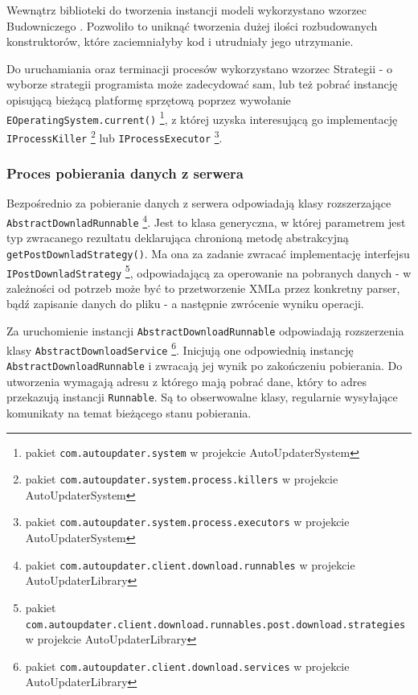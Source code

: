 \documentclass[polish,12pt,titlepage]{article}
\begin{document}
Wewnątrz biblioteki do tworzenia instancji  modeli wykorzystano wzorzec
Budowniczego \cite{BUDOWNICZY}. Pozwoliło to uniknąć tworzenia dużej ilości
rozbudowanych konstruktorów, które zaciemniałyby kod i utrudniały jego
utrzymanie.

Do uruchamiania oraz terminacji procesów wykorzystano wzorzec Strategii
\cite{STRATEGIA} - o wyborze strategii programista może zadecydować sam, lub
też pobrać instancję opisującą bieżącą platformę sprzętową poprzez wywołanie
\texttt{EOperatingSystem.current()}
\footnote{pakiet \texttt{com.autoupdater.system} w projekcie
AutoUpdaterSystem}, z której uzyska interesującą go implementację
\texttt{IProcessKiller} \footnote{pakiet
\texttt{com.autoupdater.system.process.killers} w projekcie AutoUpdaterSystem}
lub \texttt{IProcessExecutor} \footnote{pakiet
\texttt{com.autoupdater.system.process.executors}
w projekcie AutoUpdaterSystem}.

\subsubsection{Proces pobierania danych z serwera}

Bezpośrednio za pobieranie danych z serwera odpowiadają klasy rozszerzające
\texttt{AbstractDownladRunnable} \footnote{pakiet 
\texttt{com.autoupdater.client.download.runnables} w 
projekcie AutoUpdaterLibrary}. Jest to klasa generyczna, w której
parametrem jest typ zwracanego rezultatu deklarująca chronioną metodę
abstrakcyjną \texttt{getPostDownladStrategy()}. Ma ona za zadanie zwracać
implementację interfejsu \texttt{IPostDownladStrategy} \footnote{pakiet
\texttt{com.autoupdater.client.download.runnables.post.download.strategies} w
projekcie AutoUpdaterLibrary}, odpowiadającą za
operowanie na pobranych danych - w zależności od potrzeb może być to
przetworzenie XMLa przez konkretny parser, bądź zapisanie danych do pliku - a
następnie zwrócenie wyniku operacji.

Za uruchomienie instancji \texttt{AbstractDownloadRunnable} odpowiadają
rozszerzenia klasy \texttt{AbstractDownloadService} \footnote{pakiet
\texttt{com.autoupdater.client.download.services} w projekcie
AutoUpdaterLibrary}. Inicjują one odpowiednią instancję
\texttt{AbstractDownloadRunnable} i zwracają jej wynik po zakończeniu
pobierania. Do utworzenia wymagają adresu z którego mają pobrać dane, który to
adres przekazują instancji \texttt{Runnable}. Są to obserwowalne klasy,
regularnie wysyłające komunikaty na temat bieżącego stanu pobierania.
\end{document}
